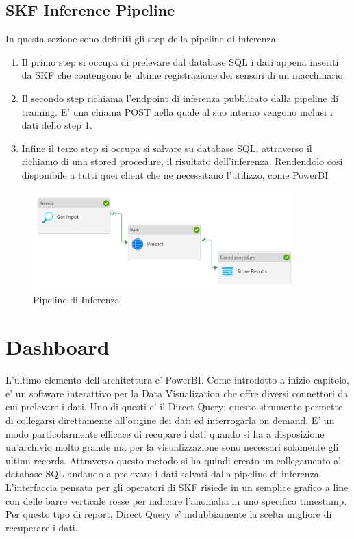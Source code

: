 \subsection{SKF Inference Pipeline}
In questa sezione sono definiti gli step della pipeline di inferenza.
\begin{enumerate}
\item Il primo step si occupa di prelevare dal database SQL i dati appena inseriti da SKF che contengono le ultime registrazione dei sensori di un macchinario. 
\item Il secondo step richiama l'endpoint di inferenza pubblicato dalla pipeline di training. E' una chiama POST nella quale al suo interno vengono inclusi i dati dello step 1.
\item Infine il terzo step si occupa si salvare su database SQL, attraverso il richiamo di una stored procedure, il risultato dell'inferenza. Rendendolo cosi disponibile a tutti quei client che ne necessitano l'utilizzo, come PowerBI
\end{enumerate}

\begin{figure}[t]
\centering
\includegraphics[width=10cm, scale=1]{images/pipeline-inference}
  \caption{Pipeline di Inferenza}
	\label{pipeline-inferenza}

\end{figure}

\section{Dashboard}
L'ultimo elemento dell'architettura e' PowerBI. Come introdotto a inizio capitolo, e' un software interattivo per la Data Visualization che offre diversi connettori da cui prelevare i dati. Uno di questi e' il Direct Query: questo strumento permette di collegarsi direttamente all'origine dei dati ed interrogarla on demand. E' un modo particolarmente efficace di recupare i dati quando si ha a disposizione un'archivio molto grande ma per la visualizzazione sono necessari solamente gli ultimi records. 
Attraverso questo metodo si ha quindi creato un collegamento al database SQL andando a prelevare i dati salvati dalla pipeline di inferenza.
L'interfaccia pensata per gli operatori di SKF risiede in un semplice grafico a line con delle barre verticale rosse per indicare l'anomalia in uno specifico timestamp. Per questo tipo di report, Direct Query e' indubbiamente la scelta migliore di recuperare i dati.  


